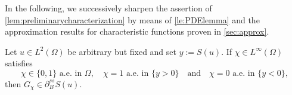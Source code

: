 \documentclass[reqno]{shinyart}
\begin{document}
In the following, we successively sharpen the assertion of 
\cref{lem:preliminarycharacterization} by means of \cref{le:PDElemma}
and the approximation results for characteristic functions proven in \cref{sec:approx}.

\begin{proposition}\label{prop:suffstrong}
    Let $u \in L^2(\Omega)$ be arbitrary but fixed and set $y := S(u)$.
    If $\chi \in L^\infty(\Omega)$ satisfies
    \begin{equation}\label{eq:chicondstrong}
        \chi \in \{0, 1\} \text{ a.e.\ in }\Omega, \quad \chi = 1 \text{ a.e.\ in } \{y > 0\}
        \quad \text{and} \quad \chi = 0 \text{ a.e.\ in } \{y < 0\},
    \end{equation}
    then $G_\chi \in \partial_B^{ss} S(u)$.
\end{proposition}
\end{document}
